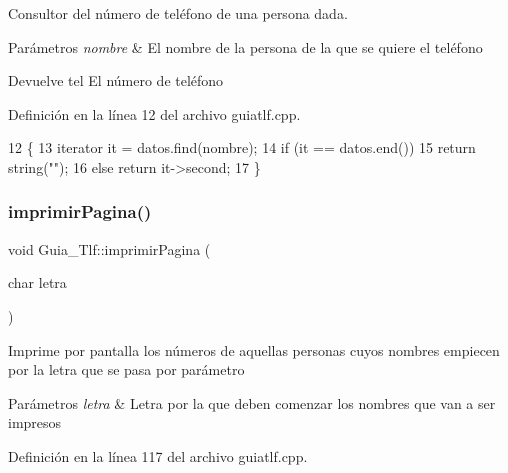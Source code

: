 Consultor del número de teléfono de una persona dada. 


\begin{DoxyParams}{Parámetros}
{\em nombre} & El nombre de la persona de la que se quiere el teléfono \\
\hline
\end{DoxyParams}
\begin{DoxyReturn}{Devuelve}
tel El número de teléfono 
\end{DoxyReturn}


Definición en la línea 12 del archivo guiatlf.\+cpp.


\begin{DoxyCode}
12                                                   \{
13     iterator it = datos.find(nombre);
14     \textcolor{keywordflow}{if} (it == datos.end())
15         \textcolor{keywordflow}{return} \textcolor{keywordtype}{string}(\textcolor{stringliteral}{""});
16     \textcolor{keywordflow}{else} \textcolor{keywordflow}{return} it->second;
17 \}
\end{DoxyCode}
\mbox{\label{classGuia__Tlf_af6ebc2270d978317b0f6a491ae02e9be}} 
\subsubsection{\texorpdfstring{imprimir\+Pagina()}{imprimirPagina()}}
{\footnotesize\ttfamily void Guia\+\_\+\+Tlf\+::imprimir\+Pagina (\begin{DoxyParamCaption}\item[{char}]{letra }\end{DoxyParamCaption})}

Imprime por pantalla los números de aquellas personas cuyos nombres empiecen por la letra que se pasa por parámetro 
\begin{DoxyParams}{Parámetros}
{\em letra} & Letra por la que deben comenzar los nombres que van a ser impresos \\
\hline
\end{DoxyParams}


Definición en la línea 117 del archivo guiatlf.\+cpp.


